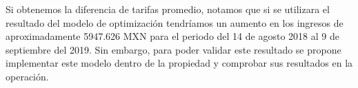 Si obtenemos la diferencia de tarifas promedio, notamos que si se utilizara el resultado del modelo de optimización tendríamos un aumento en los ingresos de aproximadamente 5947.626 MXN para el periodo del 14 de agosto 2018 al 9 de septiembre del 2019. Sin embargo, para poder validar este resultado se propone implementar este modelo dentro de la propiedad y comprobar sus resultados en la operación.




